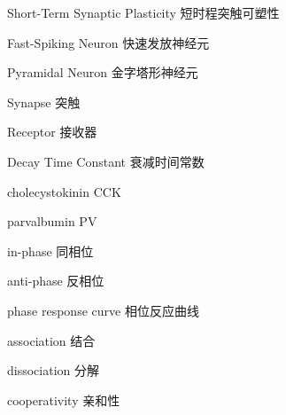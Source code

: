 \begin{denotation}

\item[Short-Term Synaptic Plasticity] 短时程突触可塑性
\item[Fast-Spiking Neuron] 快速发放神经元
\item[Pyramidal Neuron] 金字塔形神经元
\item[Synapse] 突触
\item[Receptor] 接收器
\item[Decay Time Constant] 衰减时间常数
\item[cholecystokinin] CCK
\item[parvalbumin] PV
\item[in-phase] 同相位
\item[anti-phase] 反相位
\item[phase response curve] 相位反应曲线
\item[association] 结合
\item[dissociation] 分解
\item[cooperativity] 亲和性
\end{denotation}
